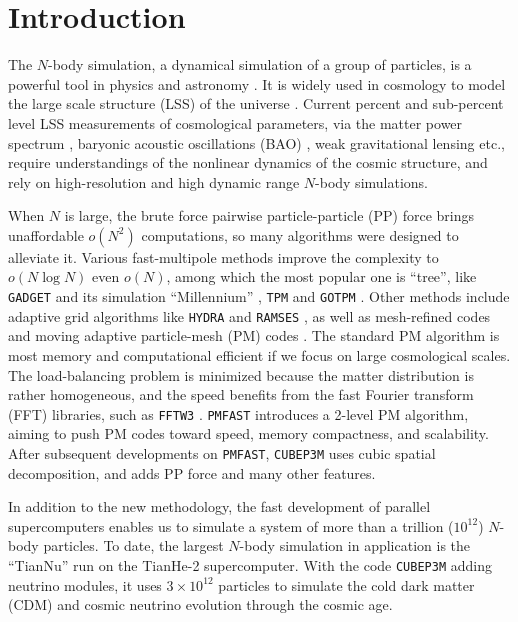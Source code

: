 \documentclass[10pt,twocolumn,preprint]{emulateapj}
\begin{document}
\section{Introduction}\label{s.intro}
The $N$-body simulation, a dynamical simulation of a group of particles, is a powerful tool in physics and astronomy \citep{1988csup.book.....H}. It is widely used in cosmology to model the large scale structure (LSS) of the universe \citep{1985ApJ...292..371D}. Current percent and sub-percent level LSS measurements of cosmological parameters, via the matter power spectrum \citep{2005MNRAS.360L..82R,2011ApJ...726....7T}, baryonic acoustic oscillations (BAO) \citep{2005ApJ...633..560E,2009ApJ...700..479T}, weak gravitational lensing \citep{2003ApJ...592..699V,2009A&A...499...31H,2009ApJ...701..945S} etc., require understandings of the nonlinear dynamics of the cosmic structure, and rely on high-resolution and high dynamic range $N$-body simulations.

When $N$ is large, the brute force pairwise particle-particle (PP) force brings unaffordable $o(N^2)$ computations, so many algorithms were designed to alleviate it. Various fast-multipole methods \citep{1985JCoPh..60..187R,2014ComAC...1....1D,2016ascl.soft09016P} improve the complexity to $o(N\log N)$ even $o(N)$, among which the most popular one is ``tree'', like {\tt GADGET} \citep{2001NewA....6...79S,2005MNRAS.364.1105S} and its simulation ``Millennium'' \citep{2005Natur.435..629S,2012MNRAS.426.2046A}, {\tt TPM} \citep{1995ApJS...98..355X} and {\tt GOTPM} \citep{2004NewA....9..111D}. Other methods include adaptive grid algorithms like {\tt HYDRA} \citep{1995ApJ...452..797C} and {\tt RAMSES} \citep{2010ascl.soft11007T}, as well as mesh-refined codes \citep{1991ApJ...368L..23C} and moving adaptive particle-mesh (PM) codes \citep{1995ApJS..100..269P}. The standard PM algorithm \citep{1988csup.book.....H} is most memory and computational efficient if we focus on large cosmological scales. The load-balancing problem is minimized because the matter distribution is rather homogeneous, and the speed benefits from the fast Fourier transform (FFT) libraries, such as {\tt FFTW3} \citep{Frigo05thedesign}. {\tt PMFAST} \citep{2005NewA...10..393M} introduces a 2-level PM algorithm, aiming to push PM codes toward speed, memory compactness, and scalability. After subsequent developments on {\tt PMFAST}, {\tt CUBEP3M} \citep{2013MNRAS.436..540H} uses cubic spatial decomposition, and adds PP force and many other features.

In addition to the new methodology, the fast development of parallel supercomputers enables us to simulate a system of more than a trillion ($10^{12}$) $N$-body particles. To date, the largest $N$-body simulation in application is the ``TianNu'' \citep{2017NatAs...1E.143Y,2017RAA....17...85E} run on the TianHe-2 supercomputer. With the code {\tt CUBEP3M} adding neutrino modules, it uses $3\times 10^{12}$ particles to simulate the cold dark matter (CDM) and cosmic neutrino evolution through the cosmic age.
\end{document}
